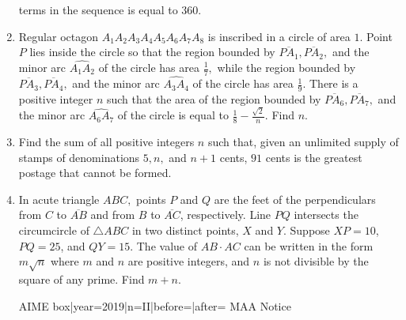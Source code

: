 \documentclass{article}
\begin{document}
\begin{enumerate}[label=\arabic*., itemsep=0.5em]
terms in the sequence is equal to $360.$\par \vspace{0.5em}\item Regular octagon $A_1A_2A_3A_4A_5A_6A_7A_8$ is inscribed in a circle of area $1.$ Point $P$ lies inside the circle so that the region bounded by $\overline{PA_1},\overline{PA_2},$ and the minor arc $\widehat{A_1A_2}$ of the circle has area $\tfrac{1}{7},$ while the region bounded by $\overline{PA_3},\overline{PA_4},$ and the minor arc $\widehat{A_3A_4}$ of the circle has area $\tfrac{1}{9}.$ There is a positive integer $n$ such that the area of the region bounded by $\overline{PA_6},\overline{PA_7},$ and the minor arc $\widehat{A_6A_7}$ of the circle is equal to $\tfrac{1}{8}-\tfrac{\sqrt2}{n}.$ Find $n.$\par \vspace{0.5em}\item Find the sum of all positive integers $n$ such that, given an unlimited supply of stamps of denominations $5,n,$ and $n+1$ cents, $91$ cents is the greatest postage that cannot be formed.\par \vspace{0.5em}\item In acute triangle $ABC,$ points $P$ and $Q$ are the feet of the perpendiculars from $C$ to $\overline{AB}$ and from $B$ to $\overline{AC}$, respectively. Line $PQ$ intersects the circumcircle of $\triangle ABC$ in two distinct points, $X$ and $Y$. Suppose $XP=10$, $PQ=25$, and $QY=15$. The value of $AB\cdot AC$ can be written in the form $m\sqrt n$ where $m$ and $n$ are positive integers, and $n$ is not divisible by the square of any prime. Find $m+n$.



{{AIME box|year=2019|n=II|before=|after=}}
{{MAA Notice}}\par \vspace{0.5em}\end{enumerate}
\end{document}

